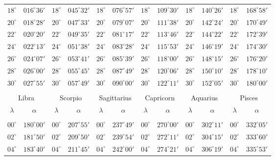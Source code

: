 \begin{table}[!h]
{\begin{tabular}{cc|cc|cc|cc|cc|cc}
$18^\circ$ & $016^\circ36'$ & $18^\circ$ & $045^\circ32'$ & $18^\circ$ & $076^\circ57'$ & $18^\circ$ & $109^\circ30'$ & $18^\circ$ & $140^\circ26'$ & $18^\circ$ & $168^\circ58'$\\
$20^\circ$ & $018^\circ28'$ & $20^\circ$ & $047^\circ33'$ & $20^\circ$ & $079^\circ07'$ & $20^\circ$ & $111^\circ38'$ & $20^\circ$ & $142^\circ24'$ & $20^\circ$ & $170^\circ49'$\\
$22^\circ$ & $020^\circ20'$ & $22^\circ$ & $049^\circ35'$ & $22^\circ$ & $081^\circ17'$ & $22^\circ$ & $113^\circ46'$ & $22^\circ$ & $144^\circ22'$ & $22^\circ$ & $172^\circ39'$\\
$24^\circ$ & $022^\circ13'$ & $24^\circ$ & $051^\circ38'$ & $24^\circ$ & $083^\circ28'$ & $24^\circ$ & $115^\circ53'$ & $24^\circ$ & $146^\circ19'$ & $24^\circ$ & $174^\circ30'$\\
$26^\circ$ & $024^\circ07'$ & $26^\circ$ & $053^\circ41'$ & $26^\circ$ & $085^\circ39'$ & $26^\circ$ & $118^\circ00'$ & $26^\circ$ & $148^\circ15'$ & $26^\circ$ & $176^\circ20'$\\
$28^\circ$ & $026^\circ00'$ & $28^\circ$ & $055^\circ45'$ & $28^\circ$ & $087^\circ49'$ & $28^\circ$ & $120^\circ06'$ & $28^\circ$ & $150^\circ10'$ & $28^\circ$ & $178^\circ10'$\\
$30^\circ$ & $027^\circ55'$ & $30^\circ$ & $057^\circ49'$ & $30^\circ$ & $090^\circ00'$ & $30^\circ$ & $122^\circ11'$ & $30^\circ$ & $152^\circ05'$ & $30^\circ$ & $180^\circ00'$\\
\multicolumn{12}{c}{}\\
\multicolumn{2}{c}{Libra}\vline & \multicolumn{2}{c}{Scorpio} \vline& \multicolumn{2}{c}{Sagittarius} \vline& \multicolumn{2}{c}{Capricorn}\vline &
\multicolumn{2}{c}{Aquarius}\vline & \multicolumn{2}{c}{Pisces}\\\hline
$\lambda$& $\alpha$& $\lambda$& $\alpha$& $\lambda$& $\alpha$& $\lambda$& $\alpha$& $\lambda$& $\alpha$& $\lambda$& $\alpha$\\\hline
&&&&&&&&&&&\\[-2ex]
$00^\circ$ & $180^\circ00'$ & $00^\circ$ & $207^\circ55'$ & $00^\circ$ & $237^\circ49'$ & $00^\circ$ & $270^\circ00'$ &  $00^\circ$ & $302^\circ11'$ & $00^\circ$ & $332^\circ05'$\\
$02^\circ$ & $181^\circ50'$ & $02^\circ$ & $209^\circ50'$ & $02^\circ$ & $239^\circ54'$ & $02^\circ$ & $272^\circ11'$ &  $02^\circ$ & $304^\circ15'$ & $02^\circ$ & $333^\circ60'$\\
$04^\circ$ & $183^\circ40'$ & $04^\circ$ & $211^\circ45'$ & $04^\circ$ & $242^\circ00'$ & $04^\circ$ & $274^\circ21'$ &  $04^\circ$ & $306^\circ19'$ & $04^\circ$ & $335^\circ53'$\\

\end{tabular}}
\end{table}
